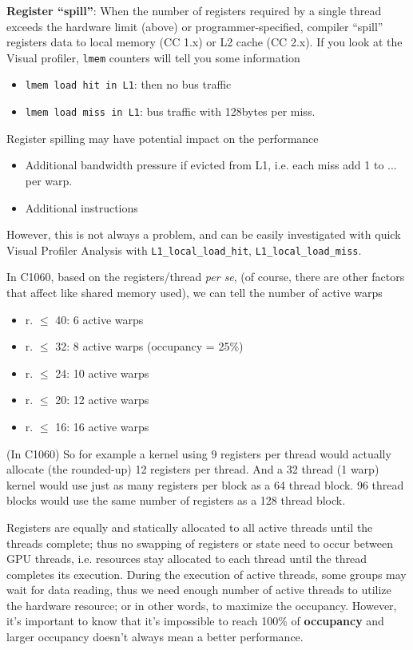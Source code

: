 {\bf Register ``spill''}: When the number of registers required by a
single thread exceeds the hardware limit (above) or
programmer-specified, compiler ``spill'' registers data to local
memory (CC 1.x) or L2 cache (CC 2.x). If you look at the Visual
profiler, \verb!lmem!  counters will tell you some information
\begin{itemize}
\item \verb!lmem load hit in L1!: then no bus traffic
\item \verb!lmem load miss in L1!: bus traffic with 128bytes per
  miss. 
\end{itemize}

\begin{framed}
  Register spilling may have potential impact on the performance
  \begin{itemize}
  \item Additional bandwidth pressure if evicted from L1, i.e. each
    miss add 1 to ... per warp.
  \item Additional instructions
  \end{itemize}
  However, this is not always a problem, and can be easily
  investigated with quick Visual Profiler Analysis with
  \verb!L1_local_load_hit!, \verb!L1_local_load_miss!. 
\end{framed}

In C1060, based on the registers/thread {\it per se}, (of course,
there are other factors that affect like shared memory used), we can
tell the number of active warps
\begin{itemize}
\item r. $\le$ 40:  6 active warps
\item r. $\le$ 32:  8 active warps (occupancy = 25\%)
\item r. $\le$ 24: 10 active warps
\item r. $\le$ 20: 12 active warps
\item r. $\le$ 16:  16 active warps
\end{itemize}

\begin{framed}
  (In C1060) So for example a kernel using 9 registers per thread
  would actually allocate (the rounded-up) 12 registers per
  thread. And a 32 thread (1 warp) kernel would use just as many
  registers per block as a 64 thread block. 96 thread blocks would use
  the same number of registers as a 128 thread block.
\end{framed}

Registers are equally and statically allocated to all active
threads until the threads complete; thus no swapping of registers or
state need to occur between GPU threads, i.e. resources stay allocated
to each thread until the thread completes its execution. During the
execution of active threads, some groups may wait for data reading,
thus we need enough number of active threads to utilize the hardware
resource; or in other words, to maximize the occupancy. However, it's
important to know that it's impossible to reach 100\% of
{\bf occupancy} and larger occupancy doesn't always mean a better
performance. 

